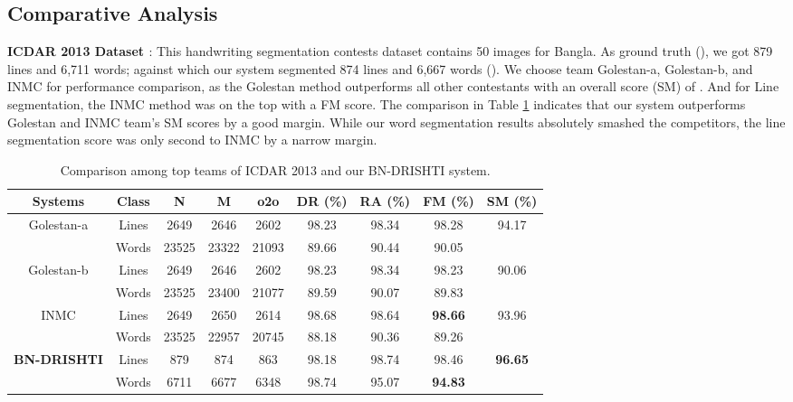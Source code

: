 \documentclass[runningheads]{llncs}
\begin{document}
\vspace{-2mm}
\subsection{Comparative Analysis}

\textbf{ICDAR 2013 Dataset \cite{stamatopoulos2013icdar}}: This handwriting segmentation contests dataset contains 50 images for Bangla. As ground truth (), we got 879 lines and 6,711 words; against which our system segmented 874 lines and 6,667 words (). We choose team Golestan-a, Golestan-b, and INMC for performance comparison, as the Golestan method outperforms all other contestants with an overall score (SM) of . And for Line segmentation, the INMC method was on the top with a  FM score. The comparison in Table \ref{drishti-tab8} indicates that our system outperforms Golestan and INMC team's SM scores by a good margin. While our word segmentation results absolutely smashed the competitors, the line segmentation score was only second to INMC by a narrow margin.

\begin{table}[h]
\vspace{-4mm}
\centering
\caption{Comparison among top teams of ICDAR 2013 and our BN-DRISHTI system.}\label{drishti-tab8}
\vspace{-1mm}
\begin{tabular}{|c|c|c|c|c|c|c|c|c|}
\hline
\textbf{Systems} & \textbf{Class} & \textbf{N} & \textbf{M} & \textbf{o2o} & \textbf{DR (\%)} & \textbf{RA (\%)} & \textbf{FM (\%)} & \textbf{SM (\%)} \\ \hline
\multirow{2}{*}{Golestan-a} & Lines & 2649 & 2646 & 2602 & 98.23 & 98.34 & 98.28 & \multirow{2}{*}{94.17} \\ \cline{2-8}
 & Words & 23525 & 23322 & 21093 & 89.66 & 90.44 & 90.05 &  \\ \hline
\multirow{2}{*}{Golestan-b} & Lines & 2649 & 2646 & 2602 & 98.23 & 98.34 & 98.23 & \multirow{2}{*}{90.06} \\ \cline{2-8}
 & Words & 23525 & 23400 & 21077 & 89.59 & 90.07 & 89.83 &  \\ \hline
\multirow{2}{*}{INMC} & Lines & 2649 & 2650 & 2614 & 98.68 & 98.64 & \textbf{98.66} & \multirow{2}{*}{93.96} \\ \cline{2-8}
 & Words & 23525 & 22957 & 20745 & 88.18 & 90.36 & 89.26 &  \\ \hline
\multirow{2}{*}{\textbf{BN-DRISHTI}} & Lines & 879 & 874 & 863 & 98.18 & 98.74 & 98.46 & \multirow{2}{*}{\textbf{96.65}} \\ \cline{2-8}
 & Words & 6711 & 6677 & 6348 & 98.74 & 95.07 & \textbf{94.83} &  \\ \hline
\end{tabular}
\vspace{-4mm}
\end{table}
\end{document}
